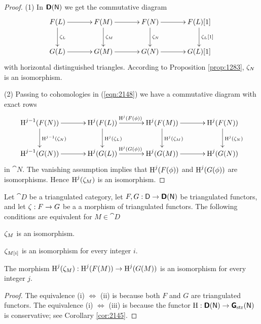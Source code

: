 \begin{proof}
(1) In $\boldsymbol{\mathsf{D}}(\operatorname{\mathsf{N}})$ we get the commutative diagram 
\begin{equation} \label{eqn:2148}
\UseTips \xymatrix @C=8ex @R=6ex {
F(L)
\ar[r]
\ar[d]^{\ze_L}
&
F(M)
\ar[r]
\ar[d]^{\ze_M}
&
F(N)
\ar[r]
\ar[d]^{\ze_N}
&
F(L)[1]
\ar[d]^{\ze_L[1]}
\\
G(L)
\ar[r]
&
G(M)
\ar[r]
&
G(N)
\ar[r]
&
G(L)[1]
} 
\end{equation}
with horizontal distinguished triangles. According to 
Proposition \ref{prop:1283}, $\zeta_N$ is an isomorphism. 

\medskip \noindent 
(2) Passing to cohomologies in (\ref{eqn:2148})
we have a commutative diagram with exact rows
\[ \UseTips \xymatrix @C=8ex @R=6ex {
\opn{H}^{j - 1}(F(N))
\ar[r]
\ar[d]^{\opn{H}^{j - 1}(\ze_{N})}
&
\opn{H}^{j}(F(L))
\ar[r]^(0.47){\opn{H}^{j}(F(\phi))}
\ar[d]^{\opn{H}^{j}(\ze_{L})}
&
\opn{H}^{j}(F(M))
\ar[r]
\ar[d]^{\opn{H}^{j}(\ze_{M})}
&
\opn{H}^{j}(F(N))
\ar[d]^{\opn{H}^{j}(\ze_{N})}
\\
\opn{H}^{j - 1}(G(N))
\ar[r]
&
\opn{H}^{j}(G(L))
\ar[r]^(0.47){\opn{H}^{j}(G(\phi))}
&
\opn{H}^{j}(G(M))
\ar[r]
&
\opn{H}^{j}(G(N)) 
} \]
in $\cat{N}$. The vanishing assumption implies that $\operatorname{H}^j(F(\phi))$ and
$\operatorname{H}^j(G(\phi))$ are isomorphisms. Hence 
$\operatorname{H}^{j}(\zeta_{M})$ is an isomorphism.
\end{proof}

\begin{lem} \label{lem:2146}
Let $\cat{D}$ be a triangulated category, let 
$F, G : \operatorname{\mathsf{D}} \to \boldsymbol{\mathsf{D}}(\operatorname{\mathsf{N}})$ be triangulated functors, and let 
$\zeta : F \to G$ be a a morphism of triangulated functors.
The following conditions are equivalent for $M \in \cat{D}$~\tup{:}
\begin{enumerate}
 $\zeta_M$ is an isomorphism. 

 $\zeta_{M[i]}$ is an isomorphism for every integer $i$. 

 The morphism 
$\operatorname{H}^j(\zeta_M) : \operatorname{H}^j(F(M)) \to \operatorname{H}^j(G(M))$
is an isomorphism for every integer $j$. 
\end{enumerate}
\end{lem}

\begin{proof}
The equivalence (i) $\Leftrightarrow$ (ii) is because both $F$ and $G$ are 
triangulated functors. 
The equivalence (i) $\Leftrightarrow$ (iii) is because
the functor 
$\operatorname{H} : \boldsymbol{\mathsf{D}}(\operatorname{\mathsf{N}}) \to \boldsymbol{\mathsf{G}}_{\mathrm{str}}(\operatorname{\mathsf{N}})$ 
is conservative; see Corollary \ref{cor:2145}.
\end{proof}

